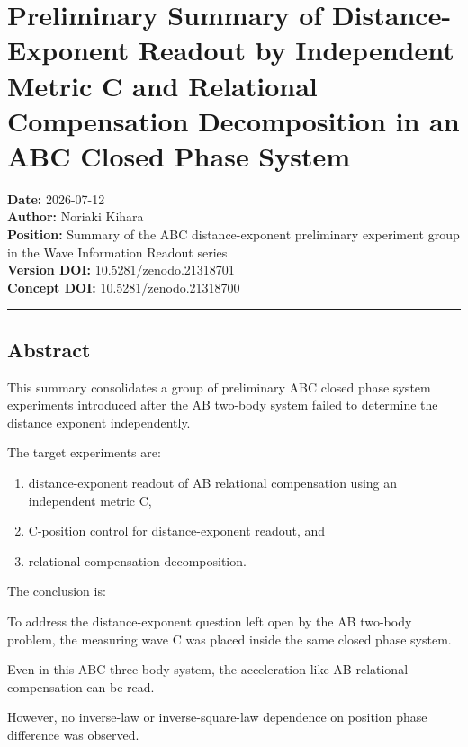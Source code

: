 \documentclass[
]{article}
\author{}
\date{}
\newenvironment{Shaded}{}{}
\newcommand{\NormalTok}[1]{#1}
\providecommand{\tightlist}{%
  \setlength{\itemsep}{0pt}\setlength{\parskip}{0pt}}
\begin{document}
\section{Preliminary Summary of Distance-Exponent Readout by Independent
Metric C and Relational Compensation Decomposition in an ABC Closed
Phase
System}\label{preliminary-summary-of-distance-exponent-readout-by-independent-metric-c-and-relational-compensation-decomposition-in-an-abc-closed-phase-system}

\textbf{Date:} 2026-07-12\\
\textbf{Author:} Noriaki Kihara\\
\textbf{Position:} Summary of the ABC distance-exponent preliminary
experiment group in the Wave Information Readout series\\
\textbf{Version DOI:} 10.5281/zenodo.21318701\\
\textbf{Concept DOI:} 10.5281/zenodo.21318700

\begin{center}\rule{0.5\linewidth}{0.5pt}\end{center}

\subsection{Abstract}\label{abstract}

This summary consolidates a group of preliminary ABC closed phase system
experiments introduced after the AB two-body system failed to determine
the distance exponent independently.

The target experiments are:

\begin{enumerate}
\def\labelenumi{\arabic{enumi}.}
\tightlist
\item
  distance-exponent readout of AB relational compensation using an
  independent metric C,
\item
  C-position control for distance-exponent readout, and
\item
  relational compensation decomposition.
\end{enumerate}

The conclusion is:

\begin{Shaded}
\begin{Highlighting}[]
\NormalTok{To address the distance{-}exponent question left open by the AB two{-}body problem,}
\NormalTok{the measuring wave C was placed inside the same closed phase system.}

\NormalTok{Even in this ABC three{-}body system, the acceleration{-}like AB relational compensation can be read.}

\NormalTok{However, no inverse{-}law or inverse{-}square{-}law dependence on position phase difference was observed.}
\end{Highlighting}
\end{Shaded}
\end{document}
